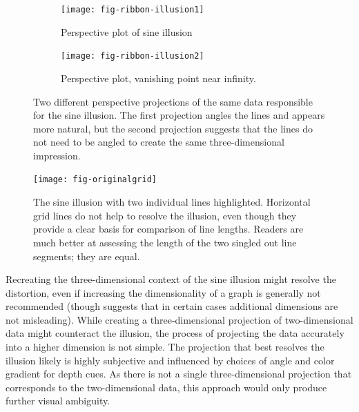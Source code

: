 \documentclass[11pt]{isuthesis}\usepackage[]{graphicx}\usepackage[]{color}
\begin{document}
\begin{figure}[h!tbp]\centering

\begin{subfigure}[t]{.49\textwidth}\centering
\texttt{[image: fig-ribbon-illusion1]}
\caption{Perspective plot of sine illusion\label{ribbon1}}
\end{subfigure}
\begin{subfigure}[t]{.49\textwidth}\centering
\texttt{[image: fig-ribbon-illusion2]}
\caption{Perspective plot, vanishing point near infinity.\label{ribbon2}}
\end{subfigure}
\caption[Three-dimensional origins of the sine illusion]{Two different perspective projections of the same data responsible for the sine illusion. The first projection angles the lines and appears more natural, but the second projection suggests that the lines do not need to be angled to create the same three-dimensional impression.\label{ribbon}}
\end{figure}




\begin{figure}
\centering
\texttt{[image: fig-originalgrid]}
\caption[Contextual origins of the sine illusion]{\label{fig:original-grid} The sine illusion with two individual lines highlighted. Horizontal grid lines do not help  to resolve the illusion, even though they provide a clear basis for comparison of line lengths. Readers are much better at assessing the length of the two singled out line segments; they are equal.}
\end{figure}

Recreating the three-dimensional context of the sine illusion might resolve the distortion, even if increasing the dimensionality of a graph is generally not recommended \citep{tufte, cleveland:1984} (though \citet{spence:1990} suggests that in certain cases additional dimensions are not misleading). While creating a three-dimensional projection of two-dimensional data might counteract the illusion, the process of projecting the data accurately into a higher dimension is not simple. The projection that best resolves the illusion likely is highly subjective and influenced by choices of angle and color gradient for depth cues. As there is not a single three-dimensional projection that corresponds to the two-dimensional data, this approach would only produce further visual ambiguity.
\end{document}

